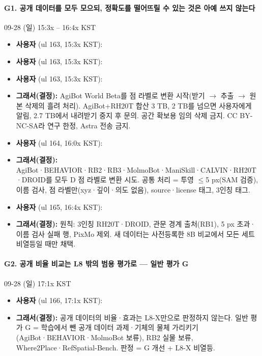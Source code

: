 \paragraph{G1. 공개 데이터를 모두 모으되, 정확도를 떨어뜨릴 수 있는 것은 아예 쓰지 않는다}
{\small 09-28 (일) 15:3x -- 16:4x KST}
\begin{itemize}
  \item \textbf{사용자} (ul 163, 15:3x KST): 
  \item \textbf{사용자} (ul 163, 15:3x KST): 
  \item \textbf{사용자} (ul 163, 15:3x KST): 
  \item \textbf{그래서(결정):} AgiBot World Beta를 점 라벨로 변환 시작(받기 $\rightarrow$ 추출 $\rightarrow$ 원본 삭제의 흘려 처리). AgiBot+RH20T 합산 3 TB, 2 TB를 넘으면 사용자에게 알림, 2.7 TB에서 내려받기 중지 후 문의. 공간 확보용 임의 삭제 금지. CC BY-NC-SA라 연구 한정, Astra 전송 금지.
  \item \textbf{사용자} (ul 164, 16:0x KST): 
  \item \textbf{그래서(결정):} AgiBot·BEHAVIOR·RB2·RB3·MolmoBot·ManiSkill·CALVIN·RH20T·DROID를 모두 D 점 라벨로 변환 시도. 공통 처리 = 투영 $\leq$5 px(SAM 검증), 이름 검사, 점 라벨만(xyz·깊이·의도 없음), source·license 태그, 3인칭 태그.
  \item \textbf{사용자} (ul 165, 16:4x KST): 
  \item \textbf{그래서(결정):} 원칙: 3인칭 RH20T·DROID, 관문 경계 출처(RB1), 5 px 초과·이름 검사 실패 행, PixMo 제외. 새 데이터는 사전등록한 8B 비교에서 모든 세트 비열등일 때만 채택.
\end{itemize}

\paragraph{G2. 공개 비율 비교는 L8 밖의 범용 평가로 --- 일반 평가 G}
{\small 09-28 (일) 17:1x KST}
\begin{itemize}
  \item \textbf{사용자} (ul 166, 17:1x KST): 
  \item \textbf{그래서(결정):} 공개 데이터의 비율·효과는 L8-X만으로 판정하지 않는다. 일반 평가 G = 학습에서 뺀 공개 데이터 과제·기체의 물체 가리키기(AgiBot·BEHAVIOR·MolmoBot 보류), RB2 실물 보류, Where2Place·RefSpatial-Bench. 판정 = G 개선 + L8-X 비열등.
\end{itemize}

